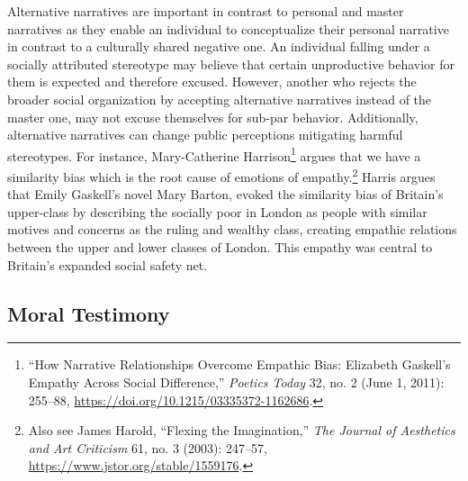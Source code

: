 \documentclass[
  12pt,
]{book}
\theoremstyle{definition}
\theoremstyle{definition}
\theoremstyle{definition}
\theoremstyle{definition}
\theoremstyle{remark}
\begin{document}
Alternative narratives are important in contrast to personal and master narratives as they enable an individual to conceptualize their personal narrative in contrast to a culturally shared negative one. An individual falling under a socially attributed stereotype may believe that certain unproductive behavior for them is expected and therefore excused. However, another who rejects the broader social organization by accepting alternative narratives instead of the master one, may not excuse themselves for sub-par behavior. Additionally, alternative narratives can change public perceptions mitigating harmful stereotypes. For instance, Mary-Catherine Harrison\footnote{{``How {Narrative Relationships Overcome Empathic Bias}: {Elizabeth Gaskell}'s {Empathy} Across {Social Difference},''} \emph{Poetics Today} 32, no. 2 (June 1, 2011): 255--88, \url{https://doi.org/10.1215/03335372-1162686}.} argues that we have a similarity bias which is the root cause of emotions of empathy.\footnote{Also see James Harold, {``Flexing the {Imagination},''} \emph{The Journal of Aesthetics and Art Criticism} 61, no. 3 (2003): 247--57, \url{https://www.jstor.org/stable/1559176}.} Harris argues that Emily Gaskell's novel Mary Barton, evoked the similarity bias of Britain's upper-class by describing the socially poor in London as people with similar motives and concerns as the ruling and wealthy class, creating empathic relations between the upper and lower classes of London. This empathy was central to Britain's expanded social safety net.

\subsection*{Moral Testimony}\label{moral-testimony}
\end{document}
